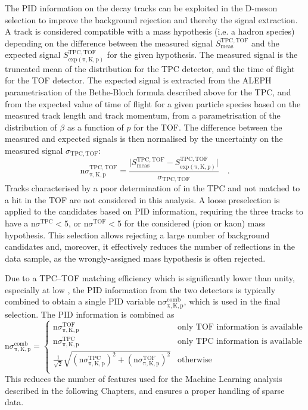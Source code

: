 The PID information on the decay tracks can be exploited in the D-meson selection to improve the background rejection and thereby the signal extraction. A track is considered compatible with a mass hypothesis (i.e. a hadron species) depending on the difference between the measured signal $S_\mathrm{meas}^\mathrm{TPC,TOF}$ and the expected signal $S_\mathrm{exp (\pi, K, p)}^\mathrm{TPC,TOF}$ for the given hypothesis. The measured signal is the truncated mean of the \dedx distribution for the TPC detector, and the time of flight for the TOF detector. The expected signal is extracted from the ALEPH parametrisation of the Bethe-Bloch formula described above for the TPC, and from the expected value of time of flight for a given particle species based on the measured track length and track momentum, from a parametrisation of the distribution of $\beta$ as a function of $p$ for the TOF. The difference between the measured and expected signals is then normalised by the uncertainty on the measured signal $\sigma_\mathrm{TPC, TOF}$:
\begin{equation*}
    \mathrm{n}\sigma_\mathrm{\pi, K, p}^\mathrm{TPC, TOF} = \frac{\lvert S_\mathrm{meas}^\mathrm{TPC, TOF} - S_\mathrm{exp (\pi, K, p)}^\mathrm{TPC, TOF}\rvert}{\sigma_\mathrm{TPC, TOF}}\quad .
\end{equation*}
Tracks characterised by a poor determination of \dedx in the TPC and not matched to a hit in the TOF are not considered in this analysis. A loose preselection is applied to the candidates based on PID information, requiring the three tracks to have a $\mathrm{n}\sigma^\mathrm{TPC} < 5$, or $\mathrm{n}\sigma^\mathrm{TOF} < 5$ for the considered (pion or kaon) mass hypothesis. This selection allows rejecting a large number of background candidates and, moreover, it effectively reduces the number of reflections in the data sample, as the wrongly-assigned mass hypothesis is often rejected.

Due to a TPC--TOF matching efficiency which is significantly lower than unity, especially at low \pt, the PID information from the two detectors is typically combined to obtain a single PID variable $\mathrm{n}\sigma^\mathrm{comb}_\mathrm{\pi, K, p}$, which is used in the final selection. The PID information is combined as
\begin{equation*}
    \mathrm{n}\sigma^\mathrm{comb}_\mathrm{\pi, K, p} = 
    \begin{cases}
        \mathrm{n}\sigma^\mathrm{TOF}_\mathrm{\pi, K, p} & \text{only TOF information is available}\\
        \mathrm{n}\sigma^\mathrm{TPC}_\mathrm{\pi, K, p} & \text{only TPC information is available}\\
        \frac{1}{\sqrt{2}}\sqrt{(\mathrm{n}\sigma^\mathrm{TPC}_\mathrm{\pi, K, p})^2 + (\mathrm{n}\sigma^\mathrm{TOF}_\mathrm{\pi, K, p})^2} & \text{otherwise}\\
    \end{cases}
\end{equation*}
This reduces the number of features used for the Machine Learning analysis described in the following Chapters, and ensures a proper handling of sparse data.


